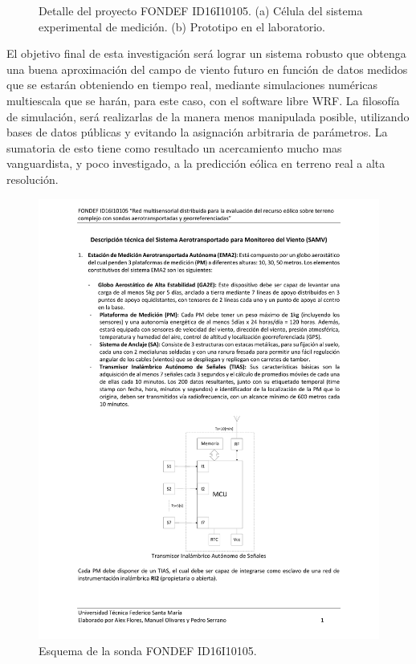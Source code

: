 \begin{figure}
\begin{minipage}{0.5\linewidth}
	\end{minipage}
	\caption{Detalle del proyecto FONDEF ID16I10105. (a) Célula del sistema experimental de medición. (b) Prototipo en el laboratorio.}
	\label{fig:01_detalle_fondef}
\end{figure}


El objetivo final de esta investigación será lograr un sistema robusto que obtenga una buena aproximación del campo de viento futuro en función de datos medidos que se estarán obteniendo en tiempo real, mediante simulaciones numéricas multiescala que se harán, para este caso, con el software libre WRF. La filosofía de simulación, será realizarlas de la manera menos manipulada posible, utilizando bases de datos públicas y evitando la asignación arbitraria de parámetros. La sumatoria de esto tiene como resultado un acercamiento mucho mas vanguardista, y poco investigado, a la predicción eólica en terreno real a alta resolución. 

\begin{figure}[h!]
	\centering
	\includegraphics[width=0.82\linewidth,page=5,trim={3cm 2cm 2.3cm 3cm},clip]{Imagenes/01/descrp}
	\caption{Esquema de la sonda FONDEF ID16I10105.}
	\label{fig:01_sonda}
\end{figure}

